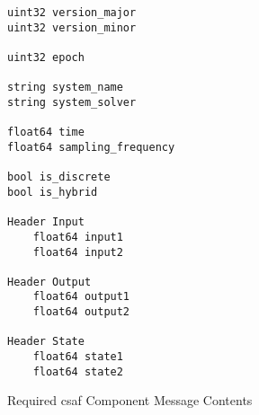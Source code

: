 \begin{figure}
\begin{lstlisting}
uint32 version_major
uint32 version_minor

uint32 epoch

string system_name
string system_solver

float64 time
float64 sampling_frequency

bool is_discrete
bool is_hybrid

Header Input
	float64 input1
	float64 input2
	
Header Output
	float64 output1
	float64 output2
	
Header State
	float64 state1
	float64 state2
\end{lstlisting}
\caption{Required \acrshort{csaf}  Component Message Contents}
\label{fig:cmsg}
\end{figure}


